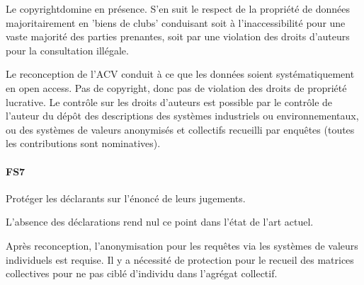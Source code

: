 Le copyright\textcopyright domine en présence. S'en suit le respect de la propriété de données majoritairement en 'biens de clubs' conduisant soit à l'inaccessibilité pour une vaste majorité des parties prenantes, soit par une violation des droits d'auteurs pour la consultation illégale.

Le reconception de l'ACV conduit à ce que les données soient systématiquement en open access.
Pas de copyright\textcopyright, donc pas de violation des droits de propriété lucrative.
Le contrôle sur les droits d'auteurs est possible par le contrôle de l'auteur du dépôt des descriptions des systèmes industriels ou environnementaux, ou des systèmes de valeurs anonymisés et collectifs recueilli par enquêtes (toutes les contributions sont nominatives). 
 
\paragraph{FS7} 
Protéger les déclarants sur l’énoncé de leurs jugements. 

L'absence des déclarations rend nul ce point dans l'état de l'art actuel.

Après reconception, l'anonymisation pour les requêtes via les systèmes de valeurs individuels est requise.
Il y a nécessité de protection pour le recueil des matrices collectives pour ne pas ciblé d'individu dans l'agrégat collectif.


